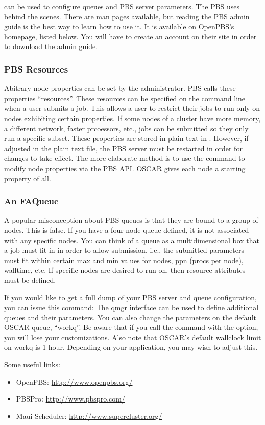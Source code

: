  can be used to configure queues and PBS server parameters.
The PBS  uses  behind the scenes.  There
are man pages available, but reading the PBS admin guide is the best
way to learn how to use it.  It is available on OpenPBS's homepage,
listed below.  You will have to create an account on their site in
order to download the admin guide.

\subsubsection{PBS Resources}

Abitrary node properties can be set by the administrator.  PBS calls
these properties ``resources''.  These resources can be specified on
the  command line when a user submits a job.  This allows a
user to restrict their jobs to run only on nodes exhibiting certain
properties.  If some nodes of a cluster have more memory, a different
network, faster prcoessors, etc., jobs can be submitted so they only
run a specific subset.  These properties are stored in plain text in
.  However, if adjusted in the
plain text file, the PBS server must be restarted in order for changes
to take effect.  The more elaborate method is to use the 
command to modify node properties via the PBS API.  OSCAR gives each
node a starting property of {all}.

\subsubsection{An FAQueue}

A popular misconception about PBS queues is that they are bound to a
group of nodes.  This is false.  If you have a four node queue
defined, it is not associated with any specific nodes.  You can think
of a queue as a multidimensional box that a job must fit in in order
to allow submission.  i.e., the submitted parameters must fit within
certain max and min values for nodes, ppn (procs per node), walltime,
etc.  If specific nodes are desired to run on, then resource
attributes must be defined.

If you would like to get a full dump of your PBS server and queue
configuration, you can issue this command:
The qmgr interface can be used to define additional queues and their
parameters.  You can also change the parameters on the default OSCAR
queue, ``workq''.  Be aware that if you call the  
command with the  option, you will lose your customizations.
Also note that OSCAR's default wallclock limit on workq is 1 hour.  
Depending on your application, you may wish to adjust this.

Some useful links:

\begin{itemize}
\item OpenPBS: \url{http://www.openpbs.org/}

\item PBSPro: \url{http://www.pbspro.com/}

\item Maui Scheduler: \url{http://www.supercluster.org/}
\end{itemize}

